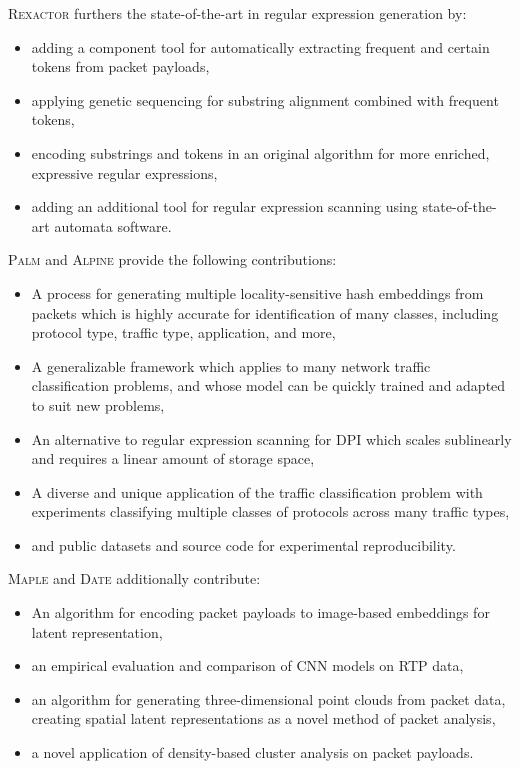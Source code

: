 \textsc{Rexactor} furthers the state-of-the-art in regular expression generation by:

\begin{itemize}
\item adding a component tool for automatically extracting frequent and certain tokens from packet payloads,
\item applying genetic sequencing for substring alignment combined with frequent tokens,
\item encoding substrings and tokens in an original algorithm for more enriched, expressive regular expressions,
\item adding an additional tool for regular expression scanning using state-of-the-art automata software. \end{itemize}

\textsc{Palm} and \textsc{Alpine} provide the following contributions:

\begin{itemize}
\item A process for generating multiple locality-sensitive hash embeddings from packets which is highly accurate for identification of many classes, including protocol type, traffic type, application, and more,
\item A generalizable framework which applies to many network traffic classification problems, and whose model can be quickly trained and adapted to suit new problems,
\item An alternative to regular expression scanning for DPI which scales sublinearly and requires a linear amount of storage space,
\item A diverse and unique application of the traffic classification problem with experiments classifying multiple classes of protocols across many traffic types,
\item and public datasets and source code for experimental reproducibility.
\end{itemize}

\textsc{Maple} and \textsc{Date} additionally contribute:

\begin{itemize}
\item An algorithm for encoding packet payloads to image-based embeddings for latent representation,
\item an empirical evaluation and comparison of CNN models on RTP data,
\item an algorithm for generating three-dimensional point clouds from packet data, creating spatial latent representations as a novel method of packet analysis,
\item a novel application of density-based cluster analysis on packet payloads.
\end{itemize}


